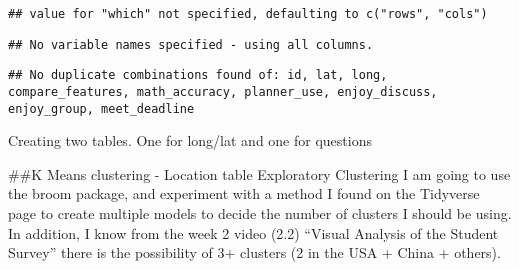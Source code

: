 \documentclass[
]{article}
\newenvironment{Shaded}{\begin{snugshade}}{\end{snugshade}}
\newcommand{\CommentTok}[1]{\textcolor[rgb]{0.56,0.35,0.01}{\textit{#1}}}
\newcommand{\DecValTok}[1]{\textcolor[rgb]{0.00,0.00,0.81}{#1}}
\newcommand{\KeywordTok}[1]{\textcolor[rgb]{0.13,0.29,0.53}{\textbf{#1}}}
\newcommand{\NormalTok}[1]{#1}
\newcommand{\OperatorTok}[1]{\textcolor[rgb]{0.81,0.36,0.00}{\textbf{#1}}}
\newcommand{\StringTok}[1]{\textcolor[rgb]{0.31,0.60,0.02}{#1}}
\begin{document}
\begin{verbatim}
## value for "which" not specified, defaulting to c("rows", "cols")
\end{verbatim}

\begin{Shaded}
\end{Shaded}

\begin{verbatim}
## No variable names specified - using all columns.
\end{verbatim}

\begin{verbatim}
## No duplicate combinations found of: id, lat, long, compare_features, math_accuracy, planner_use, enjoy_discuss, enjoy_group, meet_deadline
\end{verbatim}

\begin{Shaded}
\end{Shaded}

Creating two tables. One for long/lat and one for questions

\begin{Shaded}
\end{Shaded}

\#\#K Means clustering - Location table Exploratory Clustering I am
going to use the broom package, and experiment with a method I found on
the Tidyverse page to create multiple models to decide the number of
clusters I should be using. In addition, I know from the week 2 video
(2.2) ``Visual Analysis of the Student Survey'' there is the possibility
of 3+ clusters (2 in the USA + China + others).
\end{document}
